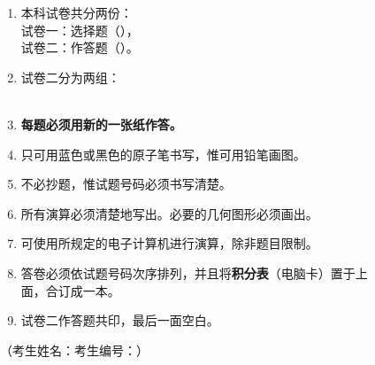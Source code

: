 \documentclass[12pt,a4paper]{exam-zh}
\newcommand{\ulinefill}[1]{\underline{\hspace{#1}}}
\begin{document}
\begin{enumerate}[label=（\arabic*）,leftmargin=2.8em,itemsep=0.38em]
  \item 本科试卷共分两份：\\
  \hspace*{1.3em}试卷一：选择题（\paperonepercentage），\\
  \hspace*{1.3em}试卷二：作答题（\papertwopercentage）。
    
  \item
  试卷二分为两组：\\
  \hspace*{1.3em}\textbf{\requiredgroupnotice}\\

  \item \textbf{每题必须用新的一张纸作答。}

  \item 只可用蓝色或黑色的原子笔书写，惟可用铅笔画图。

  \item 不必抄题，惟试题号码必须书写清楚。

  \item 所有演算必须清楚地写出。必要的几何图形必须画出。

  \item 可使用所规定的电子计算机进行演算，除非题目限制。

  \item 答卷必须依试题号码次序排列，并且将\textbf{积分表}（电脑卡）置于上\\
  面，合订成一本。

  \item 试卷二作答题共印\questionpages，最后一面空白。
\end{enumerate}

\vspace{1.0em}

\begin{center}
  \fbox{\rule{0pt}{1.15em}\hspace{1.2em}{\bfseries 未经正式宣布\quad 不得翻看内页}\hspace{1.2em}}
\end{center}

\vspace{1.2em}

\noindent
（考生姓名：\ulinefill{4.4cm}\hfill 考生编号：\ulinefill{4.3cm}）
\end{document}

